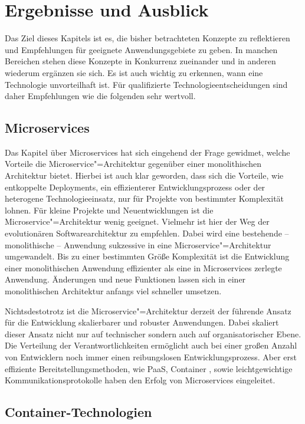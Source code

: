 \chapter{Ergebnisse und Ausblick}
\label{chap:summary}

Das Ziel dieses Kapitels ist es, die bisher betrachteten Konzepte zu reflektieren und Empfehlungen für geeignete Anwendungsgebiete zu geben. In manchen Bereichen stehen diese Konzepte in Konkurrenz zueinander und in anderen wiederum ergänzen sie sich. Es ist auch wichtig zu erkennen, wann eine Technologie unvorteilhaft ist. Für qualifizierte Technologieentscheidungen sind daher Empfehlungen wie die folgenden sehr wertvoll. 

\section{Microservices}

Das Kapitel über Microservices hat sich eingehend der Frage gewidmet, welche Vorteile die Microservice"=Architektur gegenüber einer monolithischen Architektur bietet. Hierbei ist auch klar geworden, dass sich die Vorteile, wie entkoppelte Deployments, ein effizienterer Entwicklungsprozess oder der heterogene Technologieeinsatz, nur für Projekte von bestimmter Komplexität lohnen. Für kleine Projekte und Neuentwicklungen ist die Microservice"=Architektur wenig geeignet. Vielmehr ist hier der Weg der evolutionären Softwarearchitektur zu empfehlen. Dabei wird eine bestehende -- \zB monolithische -- Anwendung sukzessive in eine Microservice"=Architektur umgewandelt. Bis zu einer bestimmten Größe \bzw Komplexität ist die Entwicklung einer monolithischen Anwendung effizienter als eine in Microservices zerlegte Anwendung. Änderungen und neue Funktionen lassen sich in einer monolithischen Architektur anfangs viel schneller umsetzen.

Nichtsdestotrotz ist die Microservice"=Architektur derzeit der führende Ansatz für die Entwicklung skalierbarer und robuster Anwendungen. Dabei skaliert dieser Ansatz nicht nur auf technischer sondern auch auf organisatorischer Ebene. Die Verteilung der Verantwortlichkeiten ermöglicht auch bei einer großen Anzahl von Entwicklern noch immer einen reibungslosen Entwicklungsprozess. Aber erst effiziente Bereitstellungsmethoden, wie PaaS, Container \ua, sowie leichtgewichtige Kommunikationsprotokolle haben den Erfolg von Microservices eingeleitet.

\section{Container-Technologien}

